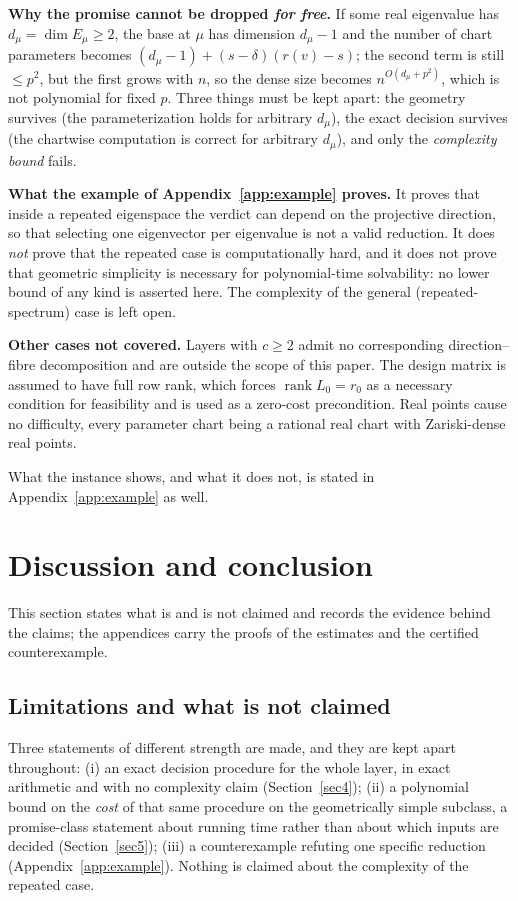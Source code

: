 \documentclass[journal]{IEEEtran}
\theoremstyle{plainn}
\theoremstyle{remark}
\newcommand{\rank}{\operatorname{rank}}
\begin{document}
\textbf{Why the promise cannot be dropped \emph{for free}.} If some real eigenvalue has
$d_\mu=\dim E_\mu\ge2$, the base at $\mu$ has dimension $d_\mu-1$ and the number of chart parameters
becomes $(d_\mu-1)+(s-\delta)(r(v)-s)$; the second term is still $\le p^{2}$, but the first grows with
$n$, so the dense size becomes $n^{O(d_\mu+p^{2})}$, which is not polynomial for fixed $p$. Three
things must be kept apart: the geometry survives (the parameterization holds for arbitrary $d_\mu$),
the exact decision survives (the chartwise computation is correct for arbitrary $d_\mu$), and only the
\emph{complexity bound} fails.

\textbf{What the example of Appendix~\ref{app:example} proves.} It proves that inside a
repeated eigenspace the verdict can depend on the projective direction, so that selecting one
eigenvector per eigenvalue is not a valid reduction. It does \emph{not} prove that the repeated case is
computationally hard, and it does not prove that geometric simplicity is necessary for polynomial-time
solvability: no lower bound of any kind is asserted here. The complexity of the general
(repeated-spectrum) case is left open.

\textbf{Other cases not covered.} Layers with $c\ge2$ admit no corresponding direction--fibre
decomposition and are outside the scope of this paper. The design matrix is assumed to have full row
rank, which forces $\rank L_0=r_0$ as a necessary condition for feasibility and is used as a zero-cost
precondition. Real points cause no difficulty, every parameter chart being a rational real chart with
Zariski-dense real points.


What the instance shows, and what it does not, is stated in Appendix~\ref{app:example} as well.


\section{Discussion and conclusion}

This section states what is and is not claimed and records the evidence behind the claims; the
appendices carry the proofs of the estimates and the certified counterexample.

\subsection{Limitations and what is not claimed}\label{sec6:sub:conclusion}


Three statements of different strength are made, and they are kept apart throughout: (i) an exact
decision procedure for the whole layer, in exact arithmetic and with no complexity claim
(Section~\ref{sec4}); (ii) a polynomial bound on the \emph{cost} of that same procedure on the
geometrically simple subclass, a promise-class statement about running time rather than about which
inputs are decided (Section~\ref{sec5}); (iii) a counterexample refuting one specific reduction
(Appendix~\ref{app:example}). Nothing is claimed about the complexity of the repeated case.
\end{document}
